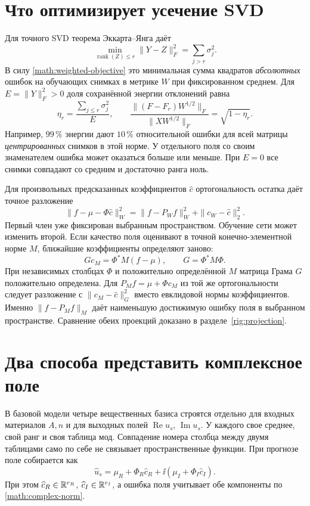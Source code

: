\section{Что оптимизирует усечение SVD}
Для точного SVD теорема Эккарта--Янга даёт
\begin{equation}
 \min_{\operatorname{rank}(Z)\le r}\|Y-Z\|_F^2
 =\sum_{j>r}\sigma_j^2.\label{math:eckart-young}
\end{equation}
В силу \eqref{math:weighted-objective} это минимальная сумма квадратов
\emph{абсолютных} ошибок на обучающих снимках в метрике $W$ при фиксированном
среднем. Для $E=\|Y\|_F^2>0$ доля сохранённой энергии отклонений равна
\begin{equation}
 \eta_r=\frac{\sum_{j\le r}\sigma_j^2}{E},\qquad
 \frac{\|(F-F_r)W^{1/2}\|_F}{\|XW^{1/2}\|_F}
 =\sqrt{1-\eta_r}.\label{math:energy}
\end{equation}
Например, $99\,\%$ энергии дают $10\,\%$ относительной ошибки для всей
матрицы \emph{центрированных} снимков в этой норме. У отдельного поля
со своим знаменателем ошибка может оказаться больше или меньше.
При $E=0$ все снимки совпадают со средним и достаточно ранга ноль.

Для произвольных предсказанных коэффициентов $\widehat c$ ортогональность
остатка даёт точное разложение
\begin{equation}
 \|f-\mu-\Phi\widehat c\|_W^2
 =\|f-P_W f\|_W^2+\|c_W-\widehat c\|_2^2.\label{math:pythagoras}
\end{equation}
Первый член уже фиксирован выбранным пространством. Обучение сети может
изменить второй. Если качество поля оценивают в точной конечно-элементной
норме $M$, ближайшие коэффициенты определяют заново:
\begin{equation}
 Gc_M=\Phi^*M(f-\mu),\qquad G=\Phi^*M\Phi.\label{math:consistent-projection}
\end{equation}
При независимых столбцах $\Phi$ и положительно определённой $M$ матрица
Грама $G$ положительно определена. Для $P_M f=\mu+\Phi c_M$ из той же
ортогональности следует разложение с $\|c_M-\widehat c\|_G^2$ вместо
евклидовой нормы коэффициентов. Именно $\|f-P_M f\|_M$ даёт наименьшую
достижимую ошибку поля в выбранном пространстве. Сравнение обеих
проекций доказано в разделе~\ref{rig:projection}.

\section{Два способа представить комплексное поле}
В базовой модели четыре вещественных базиса строятся отдельно для входных
материалов $A,n$ и для выходных полей $\operatorname{Re}u_s$,
$\operatorname{Im}u_s$. У каждого свое среднее, свой ранг и своя таблица
мод. Совпадение номера столбца между двумя таблицами само по себе
не связывает пространственные функции. При прогнозе поле собирается как
\begin{equation}
 \widehat u_s=\mu_R+\Phi_R\widehat c_R+
             \ii(\mu_I+\Phi_I\widehat c_I).\label{math:complex-decode}
\end{equation}
При этом $\widehat c_R\in\mathbb{R}^{r_R}$, $\widehat c_I\in\mathbb{R}^{r_I}$,
а ошибка поля учитывает обе компоненты по \eqref{math:complex-norm}.


